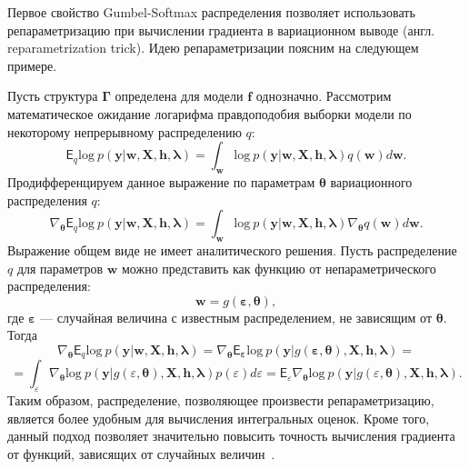 Первое свойство Gumbel-Softmax распределения позволяет использовать репараметризацию при вычислении градиента в вариационном выводе (англ. reparametrization trick). 
Идею репараметризации поясним на следующем примере.
\begin{example} Пусть структура $\boldsymbol{\Gamma}$ определена для модели $\mathbf{f}$ однозначно. Рассмотрим математическое ожидание логарифма правдоподобия выборки модели по некоторому непрерывному распределению $q$:
\[
    \mathsf{E}_q \text{log}~p(\mathbf{y}|\mathbf{w}, \mathbf{X}, \mathbf{h}, \boldsymbol{\lambda})=  \int_{\mathbf{w}} \text{log}~p(\mathbf{y}|\mathbf{w}, \mathbf{X}, \mathbf{h}, \boldsymbol{\lambda})q(\mathbf{w})d\mathbf{w}.
\]
Продифференцируем данное выражение по параметрам $\boldsymbol{\theta}$ вариационного распределения $q$:
\[
    \nabla_{\boldsymbol{\theta}} \mathsf{E}_q \text{log}~p(\mathbf{y}|\mathbf{w}, \mathbf{X}, \mathbf{h}, \boldsymbol{\lambda}) = 
\int_{\mathbf{w}}  \text{log}~p(\mathbf{y}|\mathbf{w}, \mathbf{X}, \mathbf{h}, \boldsymbol{\lambda})\nabla_{\boldsymbol{\theta}}q(\mathbf{w})d\mathbf{w}.
\]
Выражение общем виде не имеет аналитического решения. Пусть распределение $q$ для параметров $\mathbf{w}$ можно представить как функцию от непараметрического распределения:
\[
    \mathbf{w} = g(\boldsymbol{\varepsilon}, \boldsymbol{\theta}),
\]
где $\boldsymbol{\varepsilon}$ --- случайная величина с известным распределением, не зависящим от $\boldsymbol{\theta}$.
Тогда 
\[
 \nabla_{\boldsymbol{\theta}} \mathsf{E}_q \text{log}~p(\mathbf{y}|\mathbf{w}, \mathbf{X}, \mathbf{h}, \boldsymbol{\lambda}) = \nabla_{\boldsymbol{\theta}} \mathsf{E}_{\boldsymbol{\varepsilon}} \text{log}~p(\mathbf{y}|g(\boldsymbol{\varepsilon}, \boldsymbol{\theta}), \mathbf{X}, \mathbf{h}, \boldsymbol{\lambda}) =
\]
\[
= \int_{\varepsilon}  \nabla_{\boldsymbol{\theta}} \text{log}~p(\mathbf{y}|g(\varepsilon, \boldsymbol{\theta}), \mathbf{X}, \mathbf{h}, \boldsymbol{\lambda})  p(\varepsilon) d\varepsilon 
    = \mathsf{E}_\varepsilon \nabla_{\boldsymbol{\theta}} \text{log}~p(\mathbf{y}|g(\varepsilon, \boldsymbol{\theta}), \mathbf{X}, \mathbf{h}, \boldsymbol{\lambda}).
\]
Таким образом, распределение, позволяющее произвести репараметризацию, является более удобным для вычисления интегральных оценок.
Кроме того, данный подход позволяет значительно повысить точность вычисления градиента от функций, зависящих от случайных величин~\cite{reparametrization}.
\end{example}

